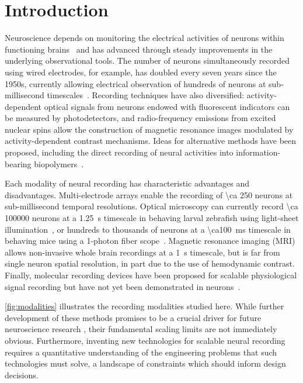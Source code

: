 \section{Introduction}
Neuroscience depends on monitoring the electrical activities of neurons within functioning brains~\cite{alivisatos2012brain, bansal2012decoding, gerhard2013successful} and has advanced through steady improvements in the underlying observational tools. The number of neurons simultaneously recorded using wired electrodes, for example, has doubled every seven years since the 1950s, currently allowing electrical observation of hundreds of neurons at sub-millisecond timescales~\cite{stevenson11}. Recording techniques have also diversified: activity-dependent optical signals from neurons endowed with fluorescent indicators can be measured by photodetectors, and radio-frequency emissions from excited nuclear spins allow the construction of magnetic resonance images modulated by activity-dependent contrast mechanisms.
Ideas for alternative methods have been proposed, including the direct recording of neural activities into information-bearing biopolymers~\cite{zamft12,glaser13,kording11a}.

Each modality of neural recording has characteristic advantages and disadvantages.
Multi-electrode arrays enable the recording of \num{\ca 250} neurons at sub-millisecond temporal resolutions.
Optical microscopy can currently record \num{\ca 100000} neurons at a \SI{1.25}{\second} timescale in behaving larval zebrafish using light-sheet illumination~\cite{ahrens13}, or hundreds to thousands of neurons at a \SI{\ca100}{\milli\second} timescale in behaving mice using a 1-photon fiber scope~\cite{ziv13}.
Magnetic resonance imaging (MRI) allows non-invasive whole brain recordings at a \SI{1}{\second} timescale, but is far from single neuron spatial resolution, in part due to the use of hemodynamic contrast.
Finally, molecular recording devices have been proposed for scalable physiological signal recording but have not yet been demonstrated in neurons~\cite{zamft12,glaser13,kording11a}.

\autoref{fig:modalities} illustrates the recording modalities studied here.
While further development of these methods promises to be a crucial driver for future neuroscience research \cite{NeuroscienceThinksBigAndCollaboratively}, their fundamental scaling limits are not immediately obvious. Furthermore, inventing new technologies for scalable neural recording requires a quantitative understanding of the engineering problems that such technologies must solve, a landscape of constraints which should inform design decisions.


